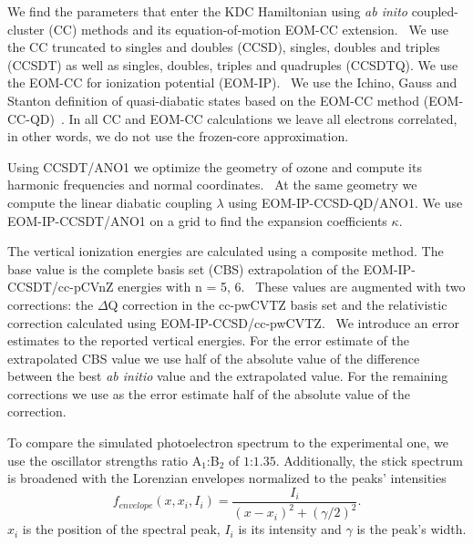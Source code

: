 \documentclass[12pt,a4paper,prb,aps,superscriptaddress]{revtex4}
\begin{document}
We find the parameters that enter the KDC Hamiltonian using \emph{ab inito}
coupled-cluster (CC) methods and its equation-of-motion EOM-CC
extension.~\cite{Bartlett:CC_review:07, Krylov:EOMRev:07, Bartlett:Book:09,
Christiansen:EOMRev:11, Bartlet:EOMRev:12, Krylov:OSRev} We use the CC
truncated to singles and doubles (CCSD), singles, doubles and triples (CCSDT)
as well as singles, doubles, triples and quadruples
(CCSDTQ).\cite{Matthews:ncc:2015}  We use the EOM-CC for ionization potential
(EOM-IP).~\cite{StantonGauss:EOMIP:99} We use the Ichino, Gauss and Stanton
definition of quasi-diabatic states based on the EOM-CC method
(EOM-CC-QD)~\cite{Stanton:EOMIPdeg:09}. In all CC and EOM-CC calculations we
leave all electrons correlated, in other words, we do not use the
frozen-core approximation.

Using CCSDT/ANO1 we optimize the geometry of ozone and compute its harmonic
frequencies and normal coordinates.~\cite{Almlof:ANO,Almlof:ANO:1988} At the
same geometry we compute the linear diabatic coupling $\lambda$ using
EOM-IP-CCSD-QD/ANO1.  We use EOM-IP-CCSDT/ANO1 on a grid to find the
expansion coefficients $\kappa$.

The vertical ionization energies are calculated using a composite method. The
base value is the complete basis set (CBS) extrapolation of the
EOM-IP-CCSDT/cc-pCVnZ energies with n = 5, 6.~\cite{Woon:95:CCBS} These values
are augmented with two corrections: the $\Delta$Q correction in the cc-pwCVTZ
basis set and the relativistic correction calculated using
EOM-IP-CCSD/cc-pwCVTZ.~\cite{Dunning:02:p(w)CVnZ} We introduce an error
estimates to the reported vertical energies. For the error estimate of the
extrapolated CBS value we use half of the absolute value of the difference
between the best \emph{ab initio} value and the extrapolated value. For the
remaining corrections we use as the error estimate half of the absolute value
of the correction.

To compare the simulated photoelectron spectrum to the experimental one, we
use the oscillator strengths ratio A$_1$:B$_2$ of $1$:$1.35$.\cite{KDC:O3:92}
Additionally, the stick spectrum is broadened with the Lorenzian envelopes
normalized to the peaks' intensities
\begin{equation}
    f _{envelope}(x, x _i, I _i) = 
    \frac{I_i}{(x-x _i)^2 + (\gamma/ 2) ^2}.
    \label{eq:lorentzian}
\end{equation}
$x _i$ is the position of the spectral peak, $I _i$ is its intensity and
$\gamma$ is the peak's width.
\end{document}
